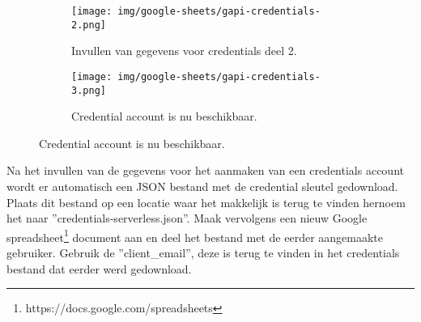 \begin{figure}[h]\ContinuedFloat
    \begin{subfigure}{0.5\textwidth}
        \captionsetup{width=0.8\linewidth}
        \texttt{[image: img/google-sheets/gapi-credentials-2.png]}
        \centering
        \caption{Invullen van gegevens voor credentials deel 2.}
    \end{subfigure}
    \begin{subfigure}{0.5\textwidth}
        \captionsetup{width=0.8\linewidth}
        \texttt{[image: img/google-sheets/gapi-credentials-3.png]}
        \centering
        \caption{Credential account is nu beschikbaar.}
    \end{subfigure}
\end{figure}

Na het invullen van de gegevens voor het aanmaken van een credentials account wordt er automatisch een JSON bestand met de credential sleutel gedownload. Plaats dit bestand op een locatie waar het makkelijk is terug te vinden hernoem het naar ''credentials-serverless.json''. Maak vervolgens een nieuw Google spreadsheet\footnote{https://docs.google.com/spreadsheets} document aan en deel het bestand met de eerder aangemaakte gebruiker. Gebruik de ''client\_email'', deze is terug te vinden in het credentials bestand dat eerder werd gedownload.